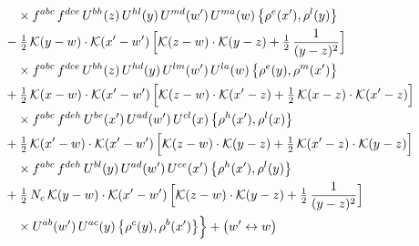 \documentclass[10pt]{article}
\numberwithin{equation}{section}
\newcommand{\KK}{\mathcal K}
\begin{document}
\begin{align}
&\qquad\times f^{abc}\,f^{dce}\,U^{bh}(z)\,U^{hl}(y)\,U^{md}(w')\,U^{ma}(w)\,\big\{\rho^{e}(x'),\rho^{l}(y)\big\}\notag\\
&\quad -\tfrac12\,\KK(y-w)\cdot\KK(x'-w')\,\Big[\KK(z-w)\cdot\KK(y-z)+\tfrac12\,\frac{1}{(y-z)^2}\Big]\notag\\
&\qquad\times f^{abc}\,f^{dce}\,U^{bh}(z)\,U^{hd}(y)\,U^{lm}(w')\,U^{la}(w)\,\big\{\rho^{e}(y),\rho^{m}(x')\big\}\notag\\
&\quad +\tfrac12\,\KK(x-w)\cdot\KK(x'-w')\,\Big[\KK(z-w)\cdot\KK(x'-z)+\tfrac12\,\KK(x-z)\cdot\KK(x'-z)\Big]\notag\\
&\qquad\times f^{abc}\,f^{deh}\,U^{be}(x')\,U^{ad}(w')\,U^{cl}(x)\,\big\{\rho^{h}(x'),\rho^{l}(x)\big\}\notag\\
&\quad +\tfrac12\,\KK(x'-w)\cdot\KK(x'-w')\,\Big[\KK(z-w)\cdot\KK(y-z)+\tfrac12\,\KK(x'-z)\cdot\KK(y-z)\Big]\notag\\
&\qquad\times f^{abc}\,f^{deh}\,U^{bl}(y)\,U^{ad}(w')\,U^{ce}(x')\,\big\{\rho^{h}(x'),\rho^{l}(y)\big\}\notag\\
&\quad +\tfrac12\,N_{c}\,\KK(y-w)\cdot\KK(x'-w')\,\Big[\KK(z-w)\cdot\KK(y-z)+\tfrac12\,\frac{1}{(y-z)^2}\Big]\notag\\
&\qquad\times U^{ab}(w')\,U^{ac}(y)\,\big\{\rho^{c}(y),\rho^{b}(x')\big\}\Big\}+\big(w'\leftrightarrow w\big)\label{eq:sum-GIII.I}
\end{align}
\end{document}

